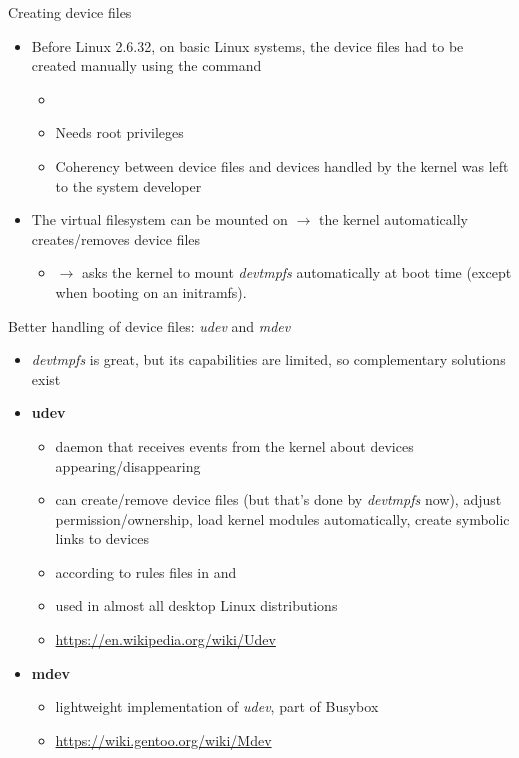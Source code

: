 \begin{frame}{Creating device files}
  \begin{itemize}
    \item Before Linux 2.6.32, on basic Linux systems,
    the device files had to be created manually using the
     command
    \begin{itemize}
    \item {}
    \item Needs root privileges
    \item Coherency between device files and devices handled by the
      kernel was left to the system developer
    \end{itemize}
  \item The  virtual filesystem can be mounted on
     $\rightarrow$ the kernel automatically creates/removes
    device files
    \begin{itemize}
    \item {} $\rightarrow$ asks the
      kernel to mount {\em devtmpfs} automatically at boot time
      (except when booting on an initramfs).
    \end{itemize}
  \end{itemize}
\end{frame}

\begin{frame}{Better handling of device files: {\em udev} and {\em mdev}}
  \begin{itemize}
  \item {\em devtmpfs} is great, but its capabilities are limited, so
    complementary solutions exist
  \item {\bf udev}
    \begin{itemize}
    \item daemon that receives events from the kernel about devices
      appearing/disappearing
    \item can create/remove device files (but that's done by
      {\em devtmpfs} now), adjust permission/ownership,
      load kernel modules automatically, create symbolic links to
      devices
    \item according to rules files in  and
    \item used in almost all desktop Linux distributions
    \item \url{https://en.wikipedia.org/wiki/Udev}
    \end{itemize}
  \item {\bf mdev}
    \begin{itemize}
    \item lightweight implementation of {\em udev}, part of Busybox
    \item \url{https://wiki.gentoo.org/wiki/Mdev}
    \end{itemize}
  \end{itemize}
\end{frame}

